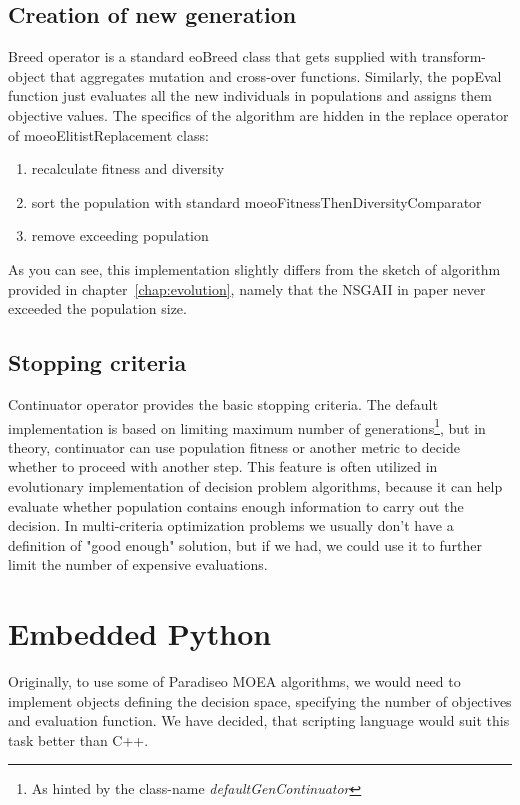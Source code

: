 \documentclass[12pt,oneside]{fithesis2}
\begin{document}
\subsection{Creation of new generation}

Breed operator is a standard eoBreed class that gets supplied with transform-object that aggregates mutation and cross-over functions. Similarly, the popEval function just evaluates all the new individuals in populations and assigns them objective values. The specifics of the algorithm are hidden in the replace operator of moeoElitistReplacement class:
\begin{enumerate}
\item recalculate fitness and diversity
\item sort the population with standard moeoFitnessThenDiversityComparator
\item remove exceeding population
\end{enumerate}

As you can see, this implementation slightly differs from the sketch of algorithm provided in chapter~\ref{chap:evolution}, namely that the NSGAII in paper\cite{deb2002fast} never exceeded the population size.

\subsection{Stopping criteria}
Continuator operator provides the basic stopping criteria. The default implementation is based on limiting maximum number of generations\footnote{As hinted by the class-name \emph{defaultGenContinuator}}, but in theory, continuator can use population fitness or another metric to decide whether to proceed with another step. This feature is often utilized in evolutionary implementation of decision problem algorithms, because it can help evaluate whether population contains enough information to carry out the decision. In multi-criteria optimization problems we usually don't have a definition of "good enough" solution, but if we had, we could use it to further limit the number of expensive evaluations.

\section{Embedded Python}
Originally, to use some of Paradiseo MOEA algorithms, we would need to implement objects defining the decision space, specifying the number of objectives and evaluation function. We have decided, that scripting language would suit this task better than C++. 
\end{document}
